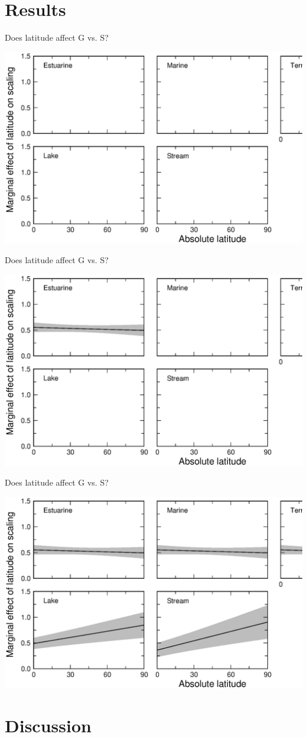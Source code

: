 \documentclass{beamer}
\begin{document}
\section*{Results}
  \begin{frame}{Does latitude affect G vs. S?}
    \begin{center}
      \includegraphics*[width=.8\textwidth]{Figures/results/Gen_vs_S_marginal_axis.eps}

    \end{center}
  \end{frame}


  \begin{frame}{Does latitude affect G vs. S?}
    \begin{center}
      \includegraphics*[width=.8\textwidth]{Figures/results/Gen_vs_S_marginal_one.eps}

    \end{center}
  \end{frame}


  \begin{frame}{Does latitude affect G vs. S?}
    \begin{center}
      \includegraphics*[width=.8\textwidth]{Figures/results/Gen_vs_S_marginal.eps}

    \end{center}
  \end{frame}

\section*{Discussion}
\end{document}
